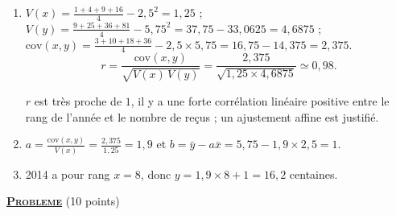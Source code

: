 \begin{description}
\begin{enumerate}
				\item {}
					$V(x) = \frac{1+4+9+16}{4} - 2{,}5^2 = 1{,}25$ ;
					$V(y) = \frac{9+25+36+81}{4} - 5{,}75^2 = 37{,}75 - 33{,}0625 = 4{,}6875$ ;
					$\mathrm{cov}(x,y) = \frac{3+10+18+36}{4} - 2{,}5 \times 5{,}75 = 16{,}75 - 14{,}375 = 2{,}375$.
					\[
						r = \frac{\mathrm{cov}(x,y)}{\sqrt{V(x)\,V(y)}} = \frac{2{,}375}{\sqrt{1{,}25 \times 4{,}6875}} \simeq 0{,}98.
					\]

					 $r$ est très proche de $1$, il y a une forte corrélation linéaire positive
					entre le rang de l'année et le nombre de reçus ; un ajustement affine est justifié.
				\item {}
					$a = \frac{\mathrm{cov}(x,y)}{V(x)} = \frac{2{,}375}{1{,}25} = 1{,}9$ et
					$b = \bar{y} - a\bar{x} = 5{,}75 - 1{,}9 \times 2{,}5 = 1$.

				\item {}
					2014 a pour rang $x = 8$, donc $y = 1{,}9 \times 8 + 1 = 16{,}2$ centaines.\newline
			\end{enumerate}
	\end{description}
\noindent \underline{\textsc{\textbf{Probleme}}} (10 points)
